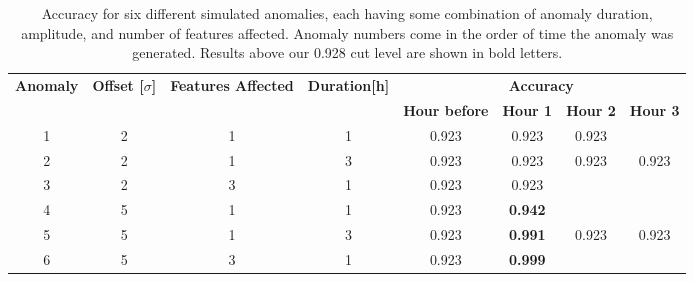 \documentclass[5p]{elsarticle}
\begin{document}
\begin{table}[htbp]
\centering
\caption{Accuracy for six different simulated anomalies, each having some combination of anomaly duration, amplitude, and number of features affected. Anomaly numbers come in the order of time the anomaly was generated. Results above our 0.928 cut level are shown in bold letters.}
\label{table:nntonfixed}
\resizebox{\linewidth}{!} {%
\begin{tabular}{@{}cccccccc@{}}
\toprule
\multirow{2}{*}{\textbf{Anomaly}} & \multirow{2}{*}{\textbf{Offset {[}$\sigma${]}}} & \multirow{2}{*}{\textbf{Features Affected}} & \multirow{2}{*}{\textbf{Duration{[}h{]}}} & \multicolumn{4}{c}{\textbf{Accuracy}}                                     \\ \cmidrule(l){5-8} 
                                  &                                                 &                                             &                                           & \textbf{Hour before} & \textbf{Hour 1} & \textbf{Hour 2} & \textbf{Hour 3} \\ \midrule
1                                 & 2                                               & 1                                           & 1                                         & 0.923                & 0.923  &     0.923            &                 \\
2                                 & 2                                               & 1                                           & 3                                         & 0.923                & 0.923  & 0.923  & 0.923           \\
3                                 & 2                                               & 3                                           & 1                                         & 0.923                & 0.923  &                 &                 \\
4                                 & 5                                               & 1                                           & 1                                         & 0.923                & \textbf{0.942}  &                 &                 \\
5                                 & 5                                               & 1                                           & 3                                         & 0.923                & \textbf{0.991}  & 0.923  & 0.923           \\
6                                 & 5                                               & 3                                           & 1                                         & 0.923                & \textbf{0.999}  &                 &                 \\ 
\bottomrule
\end{tabular}%
}
\end{table}
\end{document}
